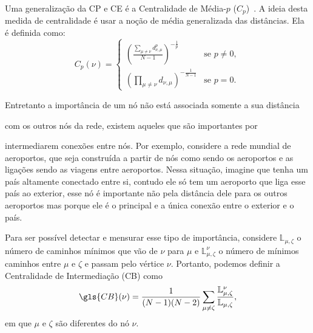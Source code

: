 Uma generalização da \gls{CP} e \gls{CE} é a Centralidade de
Média-$p$ ($C_p$)~\cite{Andrade2019}. A ideia desta medida de centralidade é usar a noção de média
generalizada das distâncias. Ela é definida como:
\begin{equation}
  C_p(\nu) = 
  \begin{cases}
    \left(\frac{\sum\limits_{\mu \neq \nu } d_{\nu,\mu}^p}{N - 1}\right)^{-\frac{1}{p}} &\text{se $p \neq 0$},\\
    \left(\prod\limits_{\mu \neq \nu} d_{\nu,\mu}\right)^{-\frac{1}{N - 1}} &\text{se }p = 0.
  \end{cases}
\end{equation}

Entretanto a importância de um nó não está associada somente a sua distância 

com os outros nós da rede, existem aqueles que são importantes por 

intermediarem
conexões entre nós. Por exemplo,
considere a rede mundial
de 
aeroportos, que seja construída a partir de nós como sendo os aeroportos e as ligações sendo as viagens entre aeroportos. Nessa situação, imagine que tenha um país altamente conectado entre si, contudo ele só tem um aeroporto que liga esse país ao exterior, esse nó é importante não pela distância dele para os outros aeroportos mas porque ele é o principal e 
a única conexão
entre o exterior e o país.

Para ser possível detectar e mensurar esse tipo de importância, considere
$\mathbb{L}_{\mu,\zeta}$ o número de caminhos mínimos que vão de $\nu$ para $\mu$ e 
$\mathbb{L}^{\nu}_{\mu,\zeta}$ 
o número de mínimos caminhos entre $\mu$ e $\zeta$ e passam pelo vértice
$\nu$. Portanto, podemos definir a Centralidade de Intermediação (\gls{CB}) como
\begin{equation}
  \gls{CB}(\nu) = \frac{1}{(N - 1)(N - 2)} \sum\limits_{\mu \neq \zeta} \frac{\mathbb{L}^{\nu}_{\mu,\zeta}}{\mathbb{L}_{\mu,\zeta}},
\end{equation}
em que $\mu$ e $\zeta$ são diferentes do nó $\nu$.

